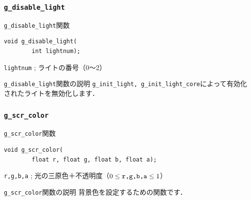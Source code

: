 \documentclass[platex,a4paper,12pt]{jsarticle}%
\begin{document}
\subsubsection{\texttt{g\_disable\_light}}

\begin{itembox}[l]{\texttt{g\_disable\_light}関数}
\begin{verbatim}
void g_disable_light(
        int lightnum);
\end{verbatim}
\verb|lightnum| ; ライトの番号（0〜2）
\end{itembox}

\begin{itembox}[l]{\texttt{g\_disable\_light}関数の説明}
\verb|g_init_light, g_init_light_core|によって有効化されたライトを無効化します．
\end{itembox}


\clearpage
\subsubsection{\texttt{g\_scr\_color}}

\begin{itembox}[l]{\texttt{g\_scr\_color}関数}
\begin{verbatim}
void g_scr_color(
        float r, float g, float b, float a);
\end{verbatim}
\verb|r,g,b,a| ; 光の三原色＋不透明度（$0\leq \verb|r,g,b,a| \leq 1$）
\end{itembox}

\begin{itembox}[l]{\texttt{g\_scr\_color}関数の説明}
	背景色を設定するための関数です．
\end{itembox}
\end{document}
